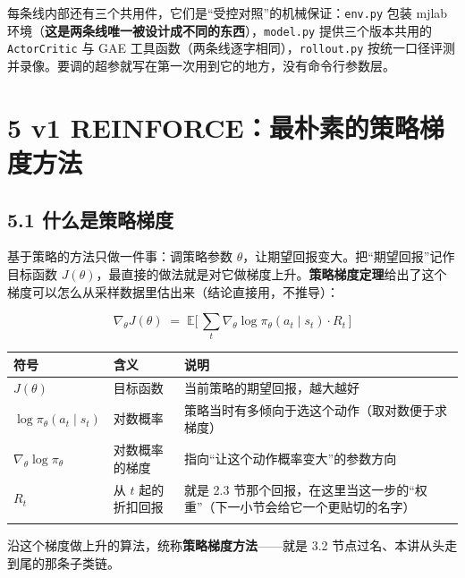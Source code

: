 \documentclass[
  chinese,
]{ctexart}
\begin{document}
每条线内部还有三个共用件，它们是``受控对照''的机械保证：\texttt{env.py}
包装 mjlab
环境（\textbf{这是两条线唯一被设计成不同的东西}），\texttt{model.py}
提供三个版本共用的 \texttt{ActorCritic} 与 GAE
工具函数（两条线逐字相同），\texttt{rollout.py}
按统一口径评测并录像。要调的超参就写在第一次用到它的地方，没有命令行参数层。

\section{5 v1
REINFORCE：最朴素的策略梯度方法}\label{v1-reinforceux6700ux6734ux7d20ux7684ux7b56ux7565ux68afux5ea6ux65b9ux6cd5}

\subsection{5.1
什么是策略梯度}\label{ux4ec0ux4e48ux662fux7b56ux7565ux68afux5ea6}

基于策略的方法只做一件事：调策略参数
\(\theta\)，让期望回报变大。把``期望回报''记作目标函数
\(J(\theta)\)，最直接的做法就是对它做梯度上升。\textbf{策略梯度定理}给出了这个梯度可以怎么从采样数据里估出来（结论直接用，不推导）：

\[
\nabla_\theta J(\theta)\;=\;\mathbb{E}\Big[\,\sum_t \nabla_\theta \log \pi_\theta(a_t\mid s_t)\cdot R_t\,\Big]
\]

\begin{center}
\begin{tabular}{@{}>{\raggedright\arraybackslash}p{} >{\raggedright\arraybackslash}p{} >{\raggedright\arraybackslash}p{}@{}}
\toprule\noalign{}
符号 & 含义 & 说明 \\
\midrule\noalign{}
\(J(\theta)\) & 目标函数 & 当前策略的期望回报，越大越好 \\
\(\log \pi_\theta(a_t\mid s_t)\) & 对数概率 & 策略当时有多倾向于选这个动作（取对数便于求梯度） \\
\(\nabla_\theta \log \pi_\theta\) & 对数概率的梯度 & 指向``让这个动作概率变大''的参数方向 \\
\(R_t\) & 从 \(t\) 起的折扣回报 & 就是 2.3 节那个回报，在这里当这一步的``权重''（下一小节会给它一个更贴切的名字） \\
\bottomrule\noalign{}
\end{tabular}
\end{center}

沿这个梯度做上升的算法，统称\textbf{策略梯度方法}------就是 3.2
节点过名、本讲从头走到尾的那条子类链。
\end{document}
